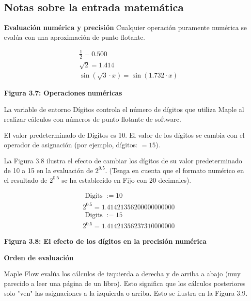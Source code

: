 
\subsection{Notas sobre la entrada matemática}
\textbf{Evaluación numérica y precisión}
Cualquier operación puramente numérica se evalúa con una aproximación de punto flotante.

\begin{equation*}
\begin{aligned}
& \frac{1}{2}=0.500 \\
& \sqrt{2}=1.414 \\
& \sin (\sqrt{3} \cdot x)=\sin (1.732 \cdot x)
\end{aligned}
\end{equation*}

\textbf{Figura 3.7: Operaciones numéricas}

La variable de entorno Dígitos controla el número de dígitos que utiliza Maple al realizar cálculos con números de punto flotante de software.

El valor predeterminado de Dígitos es 10. El valor de los dígitos se cambia con el operador de asignación (por ejemplo, dígitos: $=15$).

La Figura 3.8 ilustra el efecto de cambiar los dígitos de su valor predeterminado de 10 a 15 en la evaluación de $2^{0.5}$. (Tenga en cuenta que el formato numérico en el resultado de $2^{0.5}$ se ha establecido en Fijo con 20 decimales).

\begin{equation*}
\begin{aligned}
& \text { Digits }:=10 \\
& 2^{0.5}=1.41421356200000000000 \\
& \text { Digits }:=15 \\
& 2^{0.5}=1.41421356237310000000
\end{aligned}
\end{equation*}

\textbf{Figura 3.8: El efecto de los dígitos en la precisión numérica}

\textbf{Orden de evaluación}

Maple Flow evalúa los cálculos de izquierda a derecha y de arriba a abajo (muy parecido a leer una página de un libro). Esto significa que los cálculos posteriores solo "ven" las asignaciones a la izquierda o arriba. Esto se ilustra en la Figura 3.9.


